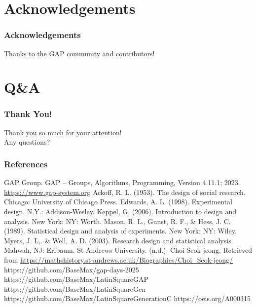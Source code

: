 \documentclass{beamer}
\begin{document}

\section{Acknowledgements}
\begin{frame}
\frametitle{Acknowledgements}
Thanks to the GAP community and contributors!
\end{frame}

\section{Q\&A}
\begin{frame}
	\frametitle{Thank You!}
	\centering
	\Large Thank you so much for your attention!\\[1em]
	\Large Any questions?
\end{frame}

\begin{frame}[allowframebreaks]
\frametitle{References}
\begin{thebibliography}{99}
 GAP Group. GAP -- Groups, Algorithms, Programming, Version 4.11.1; 2023. \url{https://www.gap-system.org}
 Ackoff, R. L. (1953). The design of social research. Chicago: University of Chicago Press.
 Edwards, A. L. (1998). Experimental design. N.Y.: Addison-Wesley.
 Keppel, G. (2006). Introduction to design and analysis. New York: NY: Worth.
 Mason, R. L., Gunst, R. F., \& Hess, J. C. (1989). Statistical design and analysis of experiments. New York: NY: Wiley.
 Myers, J. L,. \& Well, A. D. (2003). Research design and statistical analysis. Mahwah, NJ: Erlbaum.
 St Andrews University. (n.d.). Choi Seok-jeong. Retrieved from \url{https://mathshistory.st-andrews.ac.uk/Biographies/Choi_Seok-jeong/}
 https://github.com/BaseMax/gap-days-2025
 https://github.com/BaseMax/LatinSquareGAP
 https://github.com/BaseMax/LatinSquareGen
 https://github.com/BaseMax/LatinSquareGenerationC
 https://oeis.org/A000315
\end{thebibliography}
\end{frame}
\end{document}
